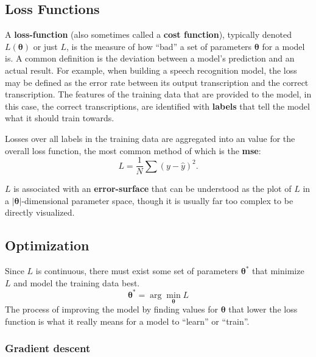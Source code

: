 \documentclass[12pt]{report}
\theoremstyle{definition}
\theoremstyle{remark}
\begin{document}

\subsection{Loss Functions}

A \textbf{\gls{loss-function}} (also sometimes called a \textbf{cost function}), typically denoted $L(\boldsymbol{\theta})$ or just $L$, is the measure of how ``bad'' a set of parameters $\boldsymbol{\theta}$ for a model is. A common definition is the deviation between a model's prediction and an actual result. For example, when building a speech recognition model, the loss may be defined as the error rate between its output transcription and the correct transcription. The features of the training data that are provided to the model, in this case, the correct transcriptions, are identified with \textbf{\glspl{label}} that tell the model what it should train towards.

Losses over all labels in the training data are aggregated into an value for the overall loss function, the most common method of which is the \textbf{\gls{mse}}:
\begin{equation}
    L = \frac{1}{N}\sum (y - \hat{y})^2 .
\end{equation}

$L$ is associated with an \textbf{\gls{error-surface}} that can be understood as the plot of $L$ in a $|\boldsymbol{\theta}|$-dimensional parameter space, though it is usually far too complex to be directly visualized.

\subsection{Optimization}\label{sec:optimization}

Since $L$ is continuous, there must exist some set of parameters $\boldsymbol{\theta}^\ast$ that minimize $L$ and model the training data best.
\begin{equation}
    \boldsymbol{\theta}^\ast = \arg\min_{\boldsymbol{\theta}} L
\end{equation}
The process of improving the model by finding values for $\boldsymbol{\theta}$ that lower the loss function is what it really means for a model to ``learn'' or ``train''.

\subsubsection{Gradient descent}
\end{document}
